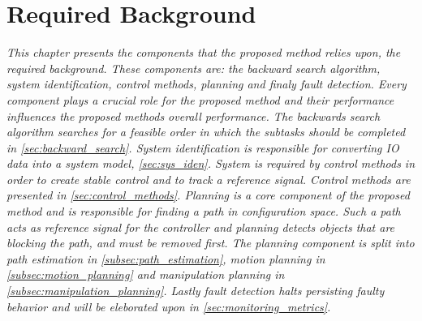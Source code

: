 \chapter{Required Background}%
\label{chap:required_background}
\textit{This chapter presents the components that the proposed method relies upon, the required background. These components are: the backward search algorithm, system identification, control methods, planning and finaly fault detection. Every component plays a crucial role for the proposed method and their performance influences the proposed methods overall performance. The backwards search algorithm searches for a feasible order in which the subtasks should be completed in \cref{sec:backward_search}. System identification is responsible for converting \ac{IO} data into a system model, \cref{sec:sys_iden}. System is required by control methods in order to create stable control and to track a reference signal. Control methods are presented in \cref{sec:control_methods}. Planning is a core component of the proposed method and is responsible for finding a path in configuration space. Such a path acts as reference signal for the controller and planning detects objects that are blocking the path, and must be removed first. The planning component is split into path estimation in \cref{subsec:path_estimation}, motion planning in \cref{subsec:motion_planning} and manipulation planning in \cref{subsec:manipulation_planning}. Lastly fault detection halts persisting faulty behavior and will be eleborated upon in \cref{sec:monitoring_metrics}.\bs}








